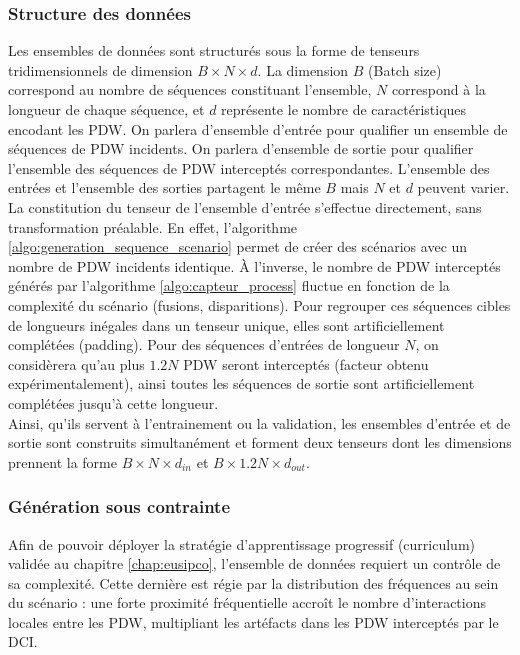 \subsubsection{Structure des données}
\label{seq:structuredonnées}
Les ensembles de données sont structurés sous la forme de tenseurs tridimensionnels de dimension $B \times N \times d$. La dimension $B$ (Batch size) correspond au nombre de séquences constituant l'ensemble, $N$ correspond à la longueur de chaque séquence, et $d$ représente le nombre de caractéristiques encodant les PDW. On parlera d'ensemble d'entrée pour qualifier un ensemble de séquences de PDW incidents. On parlera d'ensemble de sortie pour qualifier l'ensemble des séquences de PDW interceptés correspondantes. L'ensemble des entrées et l'ensemble des sorties partagent le même $B$ mais $N$ et $d$ peuvent varier.\\

La constitution du tenseur de l'ensemble d'entrée s'effectue directement, sans transformation préalable. En effet, l'algorithme \ref{algo:generation_sequence_scenario} permet de créer des scénarios avec un nombre de PDW incidents identique. À l'inverse, le nombre de PDW interceptés générés par l'algorithme \ref{algo:capteur_process} fluctue en fonction de la complexité du scénario (fusions, disparitions). Pour regrouper ces séquences cibles de longueurs inégales dans un tenseur unique, elles sont artificiellement complétées (padding). Pour des séquences d'entrées de longueur $N$, on considèrera qu'au plus $1.2N$ PDW seront interceptés (facteur obtenu expérimentalement), ainsi toutes les séquences de sortie sont artificiellement complétées jusqu'à cette longueur.\\

Ainsi, qu'ils servent à l'entrainement ou la validation, les ensembles d'entrée et de sortie sont construits simultanément et forment deux tenseurs dont les dimensions prennent la forme $B \times N \times d_{in}$ et $B \times 1.2N \times d_{out}$.

\subsubsection{Génération sous contrainte}
\label{seq:gencontr}
Afin de pouvoir déployer la stratégie d'apprentissage progressif (curriculum) validée au chapitre \ref{chap:eusipco}, l'ensemble de données requiert un contrôle de sa complexité. Cette dernière est régie par la distribution des fréquences au sein du scénario : une forte proximité fréquentielle accroît le nombre d'interactions locales entre les PDW, multipliant les artéfacts dans les PDW interceptés par le DCI.\\

